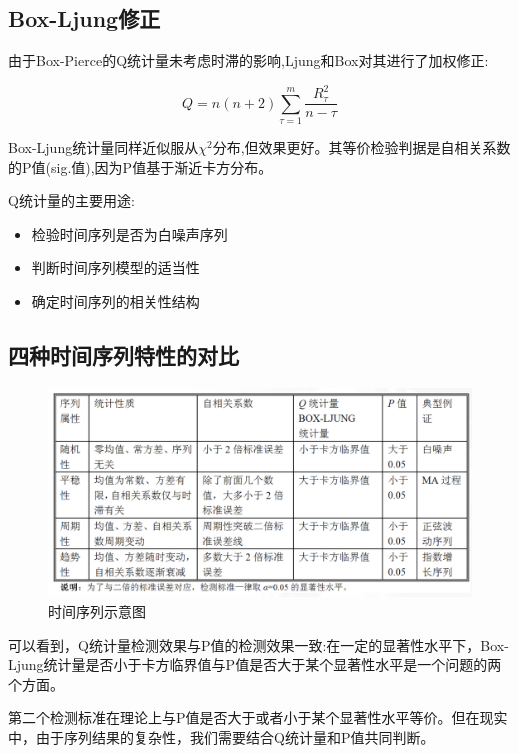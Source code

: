 \subsection{Box-Ljung修正}

由于Box-Pierce的Q统计量未考虑时滞的影响,Ljung和Box对其进行了加权修正:

\begin{equation}
Q = n(n+2)\sum_{\tau=1}^m \frac{R_\tau^2}{n-\tau}
\end{equation}

Box-Ljung统计量同样近似服从$\chi^2$分布,但效果更好。其等价检验判据是自相关系数的P值(sig.值),因为P值基于渐近卡方分布。

Q统计量的主要用途:
\begin{itemize}
    \item 检验时间序列是否为白噪声序列
    \item 判断时间序列模型的适当性
    \item 确定时间序列的相关性结构
\end{itemize}



\subsection{四种时间序列特性的对比}
\begin{figure}[htbp]
    \centering
    \includegraphics{figure/四种时间序列特性的对比.png}
    \caption{时间序列示意图}
    \label{fig:timeseries}
\end{figure}

可以看到，Q统计量检测效果与P值的检测效果一致:在一定的显著性水平下，Box-Ljung统计量是否小于卡方临界值与P值是否大于某个显著性水平是一个问题的两个方面。

第二个检测标准在理论上与P值是否大于或者小于某个显著性水平等价。但在现实中，由于序列结果的复杂性，我们需要结合Q统计量和P值共同判断。

